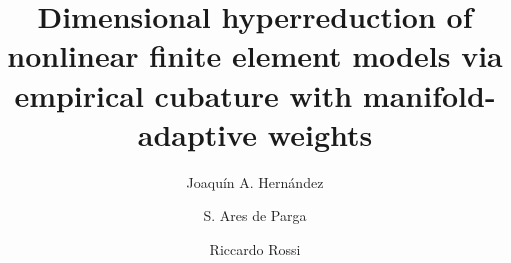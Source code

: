 \documentclass[preprint,10pt]{elsarticle}  %
\makeatletter
\newcommand{\CIMNEaffiliationnote}{\gdef\@fnmark{\(\dagger\)}}
\makeatother
\begin{document}
\begin{frontmatter}



\title{Dimensional hyperreduction of nonlinear finite element models via
empirical cubature with manifold-adaptive weights}

 \author[rvt,els]{Joaqu\'{i}n A. Hern\'{a}ndez}

\author[rvt,stan]{S. Ares de Parga\CIMNEaffiliationnote}

\author[rvt,elss]{Riccardo Rossi}


\address[rvt]{Centre Internacional de M\`{e}todes Num\`{e}rics en Enginyeria (CIMNE), Barcelona, Spain}

\address[elss]{Universitat Polit\`{e}cnica de Catalunya, Department of Civil and Environmental Engineering (DECA), Barcelona, Spain}

\address[els]{Universitat Polit\`{e}cnica de Catalunya, Departament de Resist\`{e}ncia de Materials i Estructures a l'Enginyeria, E.S. d'Enginyeries Industrial, Aeroespacial i Audiovisual de Terrassa (ESEIAAT), Terrassa, Spain}

\address[stan]{Department of Aeronautics and Astronautics, Stanford University, Stanford, CA 94305, USA}





\end{frontmatter}
\end{document}
